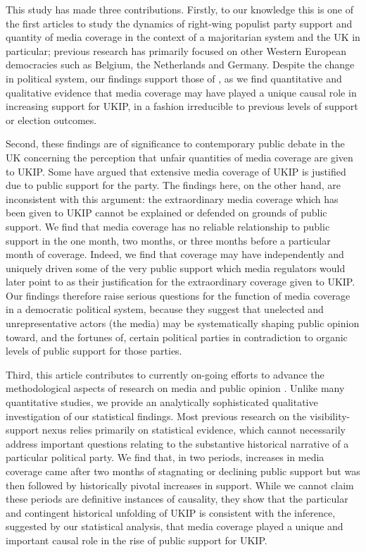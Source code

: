 \documentclass[12pt,]{article}
\begin{document}
This study has made three contributions. Firstly, to our knowledge this
is one of the first articles to study the dynamics of right-wing
populist party support and quantity of media coverage in the context of
a majoritarian system and the UK in particular; previous research has
primarily focused on other Western European democracies such as Belgium,
the Netherlands and Germany. Despite the change in political system, our
findings support those of
\citep{vliegenthart_why_2010, vliegenthart_anti-immigrant_2012}, as we
find quantitative and qualitative evidence that media coverage may have
played a unique causal role in increasing support for UKIP, in a fashion
irreducible to previous levels of support or election outcomes.

Second, these findings are of significance to contemporary public debate
in the UK concerning the perception that unfair quantities of media
coverage are given to UKIP. Some have argued that extensive media
coverage of UKIP is justified due to public support for the party. The
findings here, on the other hand, are inconsistent with this argument:
the extraordinary media coverage which has been given to UKIP cannot be
explained or defended on grounds of public support. We find that media
coverage has no reliable relationship to public support in the one
month, two months, or three months before a particular month of
coverage. Indeed, we find that coverage may have independently and
uniquely driven some of the very public support which media regulators
would later point to as their justification for the extraordinary
coverage given to UKIP. Our findings therefore raise serious questions
for the function of media coverage in a democratic political system,
because they suggest that unelected and unrepresentative actors (the
media) may be systematically shaping public opinion toward, and the
fortunes of, certain political parties in contradiction to organic
levels of public support for those parties.

Third, this article contributes to currently on-going efforts to advance
the methodological aspects of research on media and public opinion
\citep{Vliegenthart:2014di}. Unlike many quantitative studies, we
provide an analytically sophisticated qualitative investigation of our
statistical findings. Most previous research on the visibility-support
nexus relies primarily on statistical evidence, which cannot necessarily
address important questions relating to the substantive historical
narrative of a particular political party. We find that, in two periods,
increases in media coverage came after two months of stagnating or
declining public support but was then followed by historically pivotal
increases in support. While we cannot claim these periods are definitive
instances of causality, they show that the particular and contingent
historical unfolding of UKIP is consistent with the inference, suggested
by our statistical analysis, that media coverage played a unique and
important causal role in the rise of public support for UKIP.
\end{document}
